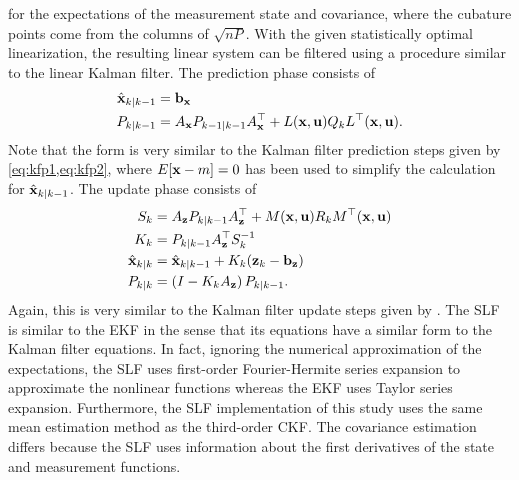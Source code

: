 \documentclass[../zhang_thesis.tex]{subfiles}
\begin{document}
for the expectations of the measurement state and covariance, where the cubature points come from the columns of $\sqrt{nP}$. With the given statistically optimal linearization, the resulting linear system can be filtered using a procedure similar to the linear Kalman filter. The prediction phase consists of
\begin{align}
    \hat{\mathbf{x}}_{k|k-1} &= \mathbf{b}_{\mathbf{x}} \\
    P_{k|k-1} &= A_{\mathbf{x}} P_{k-1|k-1} A_{\mathbf{x}}^\top + L(\mathbf{x},\mathbf{u}) Q_k L^\top(\mathbf{x},\mathbf{u}).
\end{align}
Note that the form is very similar to the Kalman filter prediction steps given by \cref{eq:kfp1,eq:kfp2}, where $E[\mathbf{x}-m]=0$ has been used to simplify the calculation for $\hat{\mathbf{x}}_{k|k-1}$. The update phase consists of
\begin{align}
    S_k &= A_{\mathbf{z}} P_{k|k-1} A_{\mathbf{z}}^\top + M(\mathbf{x},\mathbf{u}) R_k M^\top(\mathbf{x},\mathbf{u}) \\
    K_k &= P_{k|k-1} A_{\mathbf{z}}^\top S_k^{-1} \\
    \hat{\mathbf{x}}_{k|k} &= \hat{\mathbf{x}}_{k|k-1} + K_k (\mathbf{z}_k - \mathbf{b}_{\mathbf{z}}) \\
    P_{k|k} &= \left( I - K_k A_{\mathbf{z}} \right) P_{k|k-1}. \label{eq:slfl}
\end{align}
Again, this is very similar to the Kalman filter update steps given by . The SLF is similar to the EKF in the sense that its equations have a similar form to the Kalman filter equations. In fact, ignoring the numerical approximation of the expectations, the SLF uses first-order Fourier-Hermite series expansion to approximate the nonlinear functions whereas the EKF uses Taylor series expansion. Furthermore, the SLF implementation of this study uses the same
mean estimation method as the third-order CKF. The covariance estimation differs because the SLF uses information about the first derivatives of the state and measurement functions.
\end{document}
